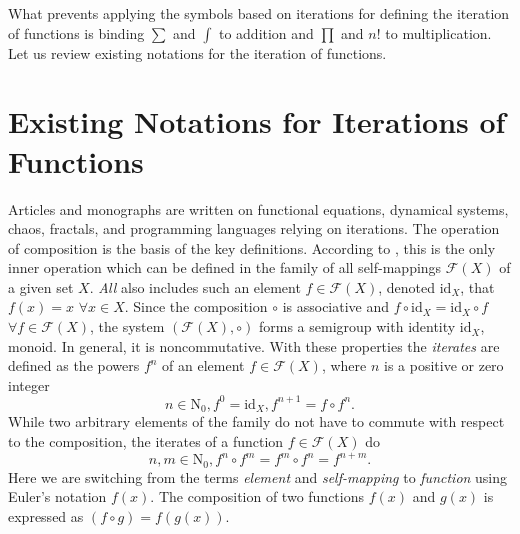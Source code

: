 \documentclass{article}
\begin{document}
What prevents applying the symbols based on iterations for defining the iteration of functions is binding $\sum$ and $\int$ to addition and $\prod$ and $n!$ to multiplication. Let us review existing notations for the iteration of functions.

\section{Existing Notations for Iterations of Functions}

Articles and monographs are written on functional equations, dynamical systems, chaos, fractals, and programming languages relying on iterations. The operation of composition is the basis of the key definitions. According to \cite{kuczma}, this is the only inner operation which can be defined in the family of all self-mappings $\mathcal{F}(X)$ of a given set $X$. \textit{All} also includes such an element $f \in \mathcal{F}(X)$, denoted $\mathrm{id}_X$, that $f(x) = x$ $\forall x \in X$. Since the composition $\circ$ is associative and $f \circ \mathrm{id}_X = \mathrm{id}_X \circ f$ $\forall f \in \mathcal{F}(X)$, the system $(\mathcal{F}(X), \circ)$ forms a semigroup with identity $\mathrm{id}_X$, monoid. In general, it is noncommutative. With these properties the \textit{iterates} are defined as the powers $f^n$ of an element $f \in \mathcal{F}(X)$, where $n$ is a positive or zero integer
\begin{displaymath}
n \in \mathrm{N}_0, f^0 = \mathrm{id}_X, f^{n + 1} = f \circ f^n.
\end{displaymath}
While two arbitrary elements of the family do not have to commute with respect to the composition, the iterates of a function $f \in \mathcal{F}(X)$ do
\begin{displaymath}
n, m \in \mathrm{N}_0, f^n \circ f^m = f^m \circ f^n = f^{n + m}.
\end{displaymath}
Here we are switching from the terms \textit{element} and \textit{self-mapping} to \textit{function} using Euler's notation $f(x)$. The composition of two functions $f(x)$ and $g(x)$ is expressed as $(f \circ g) = f(g(x))$.
\end{document}
